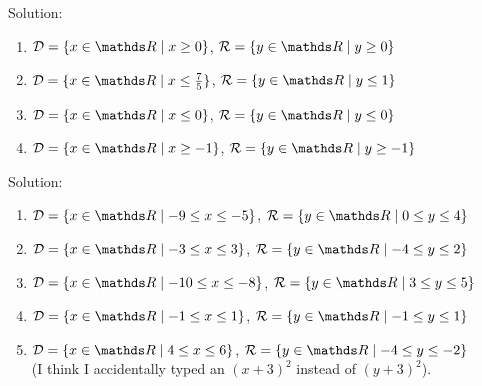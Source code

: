 \documentclass[12pt]{article} %
\begin{document}
\newpage

\begin{qstn}
  Solution:
  \begin{enumerate}[label=(\alph*)]
      \item $\mathcal{D} = \{x\in \R \mid x \geq 0\} $, $\mathcal{R} = \{y \in \R \mid y \geq 0\} $
      \item $\mathcal{D} = \{x\in \R \mid x \leq \frac{7}{5}\} $, $\mathcal{R} = \{y \in \R \mid y \leq 1\} $
      \item $\mathcal{D} = \{x\in \R \mid x \leq 0\} $, $\mathcal{R} = \{y \in \R \mid y \leq 0\} $
      \item $\mathcal{D} = \{x\in \R \mid x \geq -1\} $, $\mathcal{R} = \{y \in \R \mid y \geq -1\} $
  \end{enumerate}
\end{qstn}

\begin{qstn}
  Solution:
  \begin{enumerate}[label=(\alph*)]
      \item $\mathcal{D} = \{x\in \R \mid -9 \leq x \leq -5\} $, $\mathcal{R} = \{y \in \R \mid 0 \leq y \leq 4\} $
      \item $\mathcal{D} = \{x\in \R \mid -3 \leq x \leq 3\} $, $\mathcal{R} = \{y \in \R \mid -4 \leq y \leq 2\} $
      \item $\mathcal{D} = \{x\in \R \mid -10 \leq x \leq -8\} $, $\mathcal{R} = \{y \in \R \mid 3 \leq y \leq 5\} $
      \item $\mathcal{D} = \{x\in \R \mid -1 \leq x \leq 1\} $, $\mathcal{R} = \{y \in \R \mid -1 \leq y \leq 1\} $
      \item $\mathcal{D} = \{x\in \R \mid 4 \leq x \leq 6\} $, $\mathcal{R} = \{y \in \R \mid -4 \leq y \leq -2\} $\\
        (I think I accidentally typed an $(x+3)^2$ instead of $(y + 3)^2$).
  \end{enumerate}
\end{qstn}
\end{document}

